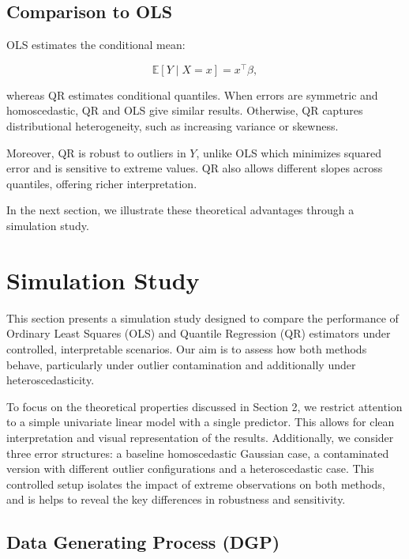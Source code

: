 \documentclass[fleqn,10pt]{latex/stylish_article} %
\begin{document}
\subsection{Comparison to OLS}\label{comparison-to-ols}

OLS estimates the conditional mean:

\[
\mathbb{E}[Y \mid X = x] = x^\top \beta,
\]

whereas QR estimates conditional quantiles. When errors are symmetric and homoscedastic, QR and OLS give similar results. Otherwise, QR captures distributional heterogeneity, such as increasing variance or skewness.

Moreover, QR is robust to outliers in \(Y\), unlike OLS which minimizes squared error and is sensitive to extreme values. QR also allows different slopes across quantiles, offering richer interpretation.

In the next section, we illustrate these theoretical advantages through a simulation study.

\section{Simulation Study}\label{simulation-study}

This section presents a simulation study designed to compare the performance of Ordinary Least Squares (OLS) and Quantile Regression (QR) estimators under controlled, interpretable scenarios. Our aim is to assess how both methods behave, particularly under outlier contamination and additionally under heteroscedasticity.

To focus on the theoretical properties discussed in Section 2, we restrict attention to a simple univariate linear model with a single predictor. This allows for clean interpretation and visual representation of the results. Additionally, we consider three error structures: a baseline homoscedastic Gaussian case, a contaminated version with different outlier configurations and a heteroscedastic case. This controlled setup isolates the impact of extreme observations on both methods, and is helps to reveal the key differences in robustness and sensitivity.

\subsection{Data Generating Process (DGP)}\label{data-generating-process-dgp}
\end{document}

